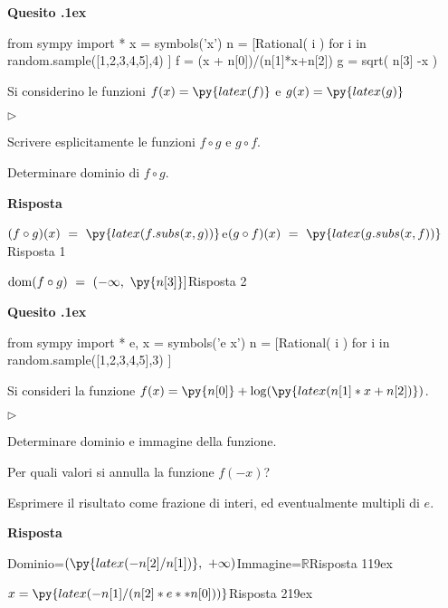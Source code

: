 \documentclass[11pt,twoside,a4paper]{article}
\newcommand{\mylabel}[1]{#1\hfill}
\renewenvironment{itemize}
  {\begin{list}{$\triangleright$}{%
   \setlength{\parskip}{0mm}
   \setlength{\topsep}{.4\baselineskip}
   \setlength{\rightmargin}{0mm}
   \setlength{\listparindent}{0mm}
   \setlength{\itemindent}{0mm}
   \setlength{\labelwidth}{2ex}
   \setlength{\itemsep}{.4\baselineskip}
   \setlength{\parsep}{0mm}
   \setlength{\partopsep}{0mm}
   \setlength{\labelsep}{1ex}
   \setlength{\leftmargin}{\labelwidth+\labelsep}
   \let\makelabel\mylabel}}{%
   \end{list}\vspace*{-1.3mm}}
\newcounter{quesito}
\newenvironment{question}{\bigskip\addtocounter{quesito}{1}\bigskip\bigskip\par\textbf{Quesito \thequesito.\kern1ex}}{\vspace{\parskip}}
\newenvironment{answer}{\par\textbf{Risposta\quad}}{\vspace{\parskip}}
\begin{document}
\begin{question}
\def\dom{{\rm dom}}
\def\range{{\rm im}}
\begin{pycode}
from sympy import *
x = symbols('x')
n = [Rational( i ) for i in random.sample([1,2,3,4,5],4) ]
f = (x + n[0])/(n[1]*x+n[2])
g = sqrt( n[3] -x )
\end{pycode}
Si considerino le funzioni $\displaystyle f(x) = \py{latex(f)}$ e $\displaystyle g(x) =\py{latex(g)}$
\begin{itemize}
\item[1.] Scrivere esplicitamente le funzioni $f \circ g$ e $g \circ f$.
\item[2.] Determinare dominio di $f \circ g$.
\end{itemize}
\begin{answer}

{\color{blue}$\displaystyle (f \circ g) (x)\ =\ \py{latex(f.subs(x,g))}$\qquad e\qquad $\displaystyle (g \circ f) (x)\ =\ \py{latex(g.subs(x,f))}$\hfill Risposta 1}

\smallskip
{\color{blue}$\dom (f \circ g)\ =\ (-\infty,\ \py{n[3]}]$\hfill Risposta 2}

\end{answer}
\end{question}

\begin{question}
\def\RR{{\mathds R}}
\begin{pycode}
from sympy import *
e, x = symbols('e x')
n = [Rational( i ) for i in random.sample([1,2,3,4,5],3) ]
\end{pycode}
Si consideri la funzione $f(x) = \py{n[0]} + \log(\py{ latex( n[1]*x+n[2] ) } )$.
\begin{itemize}
\item[1.] Determinare dominio e immagine della funzione. 
\item[2.] Per quali valori si annulla la funzione $f(-x)$?
\end{itemize}
Esprimere il risultato come frazione di interi, ed eventualmente multipli di $e$.
\begin{answer}

\end{answer}

{\color{blue} Dominio=$\displaystyle\left(\py{latex(-n[2]/n[1])},\ +\infty\right)$\qquad Immagine=$\RR$\hfill Risposta 1\kern19ex}

{\color{blue}$\displaystyle x=\py{latex(-n[1]/(n[2]*e**n[0]))}$\hfill Risposta 2\kern19ex}

\end{question}
\end{document}
